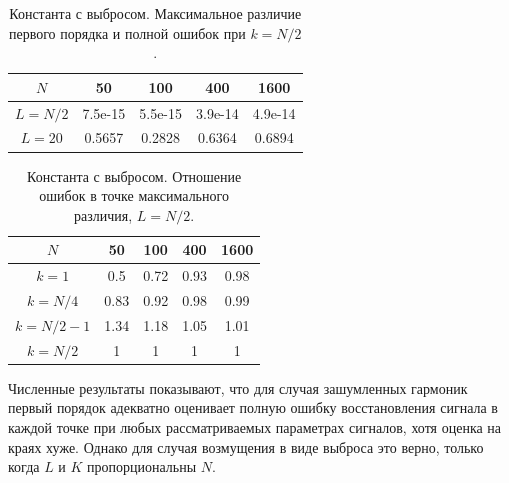\documentclass[specialist,
               substylefile = spbu.rtx,
               subf,href,colorlinks=true, 12pt]{disser}
\begin{document}
\begin{table}[H]
	\begin{center}
		\caption{Константа с выбросом. Максимальное различие первого порядка и полной ошибок при $k = N / 2$.}
		\label{tab:const_outl_2}
		\begin{tabular}{|c|c|c|c|c|}
			\hline
			$N$	& 50 & 100 & 400 & 1600 \\
			\hline
			$L = N / 2$ & 7.5e-15  & 5.5e-15  & 3.9e-14 & 4.9e-14 \\
			\hline
			$L = 20$ & 0.5657  & 0.2828  & 0.6364 & 0.6894 \\
			\hline
		\end{tabular}
	\end{center}
\end{table}

\begin{table}[H]
	\begin{center}
		\caption{Константа с выбросом. Отношение ошибок в точке максимального различия, $L = N/2$.}
		\label{tab:const_outl_ratio}
		\begin{tabular}{|c|c|c|c|c|}
			\hline
			$N$	& 50 & 100 & 400 & 1600 \\
			\hline
			$k = 1$ & 0.5  & 0.72  & 0.93 & 0.98 \\
			\hline
			$k = N/4$ & 0.83  & 0.92  & 0.98 & 0.99 \\
			\hline
			$k = N/2 - 1$ & 1.34  & 1.18  & 1.05 & 1.01 \\
			\hline
			$k = N/2$ & 1  & 1  & 1 & 1 \\
			\hline
		\end{tabular}
	\end{center}
\end{table}

Численные результаты показывают, что для случая зашумленных гармоник первый порядок адекватно оценивает полную ошибку восстановления сигнала в каждой точке при любых рассматриваемых параметрах сигналов, хотя оценка на краях хуже.
Однако для случая возмущения в виде выброса это верно, только когда $L$ и $K$ пропорциональны $N$.
\end{document}
